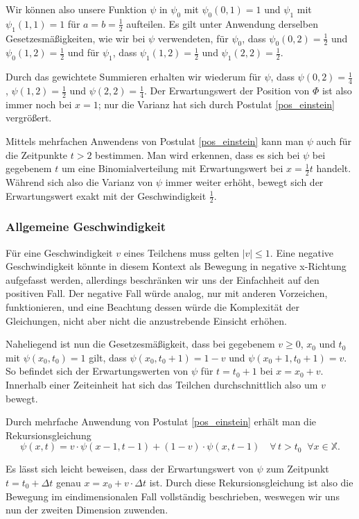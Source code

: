 \documentclass[a4paper,12pt,ngerman]{scrartcl}
\theoremstyle{plain}
\theoremstyle{plain}
\theoremstyle{plain}
\theoremstyle{plain}
\newcommand{\X}{\mathbb{X}}
\begin{document}
Wir können also unsere Funktion $\psi$ in $\psi_0$ mit $\psi_0(0,1)=1$ und $\psi_1$ mit $\psi_1(1,1)=1$ für $a=b=\frac{1}{2}$ aufteilen. Es gilt unter Anwendung derselben Gesetzesmäßigkeiten, wie wir bei $\psi$ verwendeten, für $\psi_0$, dass $\psi_0(0,2)=\frac{1}{2}$ und $\psi_0(1,2)=\frac{1}{2}$ und für $\psi_1$, dass $\psi_1(1,2)=\frac{1}{2}$ und $\psi_1(2,2)=\frac{1}{2}$. 

Durch das gewichtete Summieren erhalten wir wiederum für $\psi$, dass $\psi(0,2)=\frac{1}{4}$, $\psi(1,2)=\frac{1}{2}$ und $\psi(2,2)=\frac{1}{4}$. Der Erwartungswert der Position von $\Phi$ ist also immer noch bei $x=1$; nur die Varianz hat sich durch Postulat \ref{pos_einstein} vergrößert.

Mittels mehrfachen Anwendens von Postulat \ref{pos_einstein} kann man $\psi$ auch für die Zeitpunkte $t>2$ bestimmen. Man wird erkennen, dass es sich bei $\psi$ bei gegebenem $t$ um eine Binomialverteilung mit Erwartungswert bei $x=\frac{1}{2}t$ handelt. Während sich also die Varianz von $\psi$ immer weiter erhöht, bewegt sich der Erwartungswert exakt mit der Geschwindigkeit $\frac{1}{2}$.

\subsubsection{Allgemeine Geschwindigkeit}

Für eine Geschwindigkeit $v$ eines Teilchens muss gelten $|v|\leq 1$. Eine negative Geschwindigkeit könnte in diesem Kontext als Bewegung in negative x-Richtung aufgefasst werden, allerdings beschränken wir uns der Einfachheit auf den positiven Fall. Der negative Fall würde analog, nur mit anderen Vorzeichen, funktionieren, und eine Beachtung dessen würde die Komplexität der Gleichungen, nicht aber nicht die anzustrebende Einsicht erhöhen.

Naheliegend ist nun die Gesetzesmäßigkeit, dass bei gegebenem $v\geq0$, $x_0$ und $t_0$ mit $\psi(x_0,t_0)=1$ gilt, dass $\psi(x_0,t_0+1)=1-v$ und $\psi(x_0+1,t_0+1)=v$. So befindet sich der Erwartungswerten von $\psi$ für $t=t_0+1$ bei $x=x_0+v$. Innerhalb einer Zeiteinheit hat sich das Teilchen durchschnittlich also um $v$ bewegt. 

Durch mehrfache Anwendung von Postulat \ref{pos_einstein} erhält man die Rekursionsgleichung
\[\psi(x,t)=v\cdot\psi(x-1,t-1)+(1-v)\cdot\psi(x,t-1) \quad\forall\, t>t_0 \;\;\forall x\in\X.\]

Es lässt sich leicht beweisen, dass der Erwartungswert von $\psi$ zum Zeitpunkt $t=t_0+\Delta t$ genau $x=x_0+v\cdot\Delta t$ ist. Durch diese Rekursionsgleichung ist also die Bewegung im eindimensionalen Fall vollständig beschrieben, weswegen wir uns nun der zweiten Dimension zuwenden.
\end{document}
